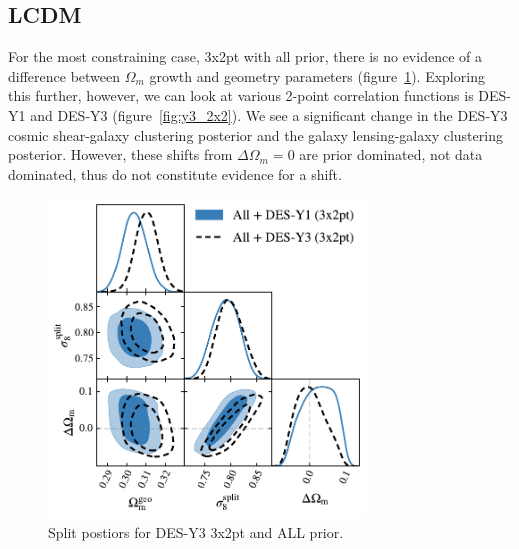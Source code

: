 \subsection{LCDM}
For the most constraining case, 3x2pt with all prior, there is no evidence of a difference between $\Omega_m$ growth and geometry parameters (figure~\ref{fig:y3_3x2_all}). Exploring this further, however, we can look at various 2-point correlation functions is DES-Y1 and DES-Y3 (figure~\ref{fig:y3_2x2}). We see a significant change in the DES-Y3 cosmic shear-galaxy clustering posterior and the galaxy lensing-galaxy clustering posterior. However, these shifts from $\Delta\Omega_m=0$ are prior dominated, not data dominated, thus do not constitute evidence for a shift.
\begin{figure}[ht]
	\centering
	\includegraphics[width=0.75\textwidth]{plots/plot204_v2.pdf}
	\caption{Split postiors for DES-Y3 3x2pt and ALL prior.}
	\label{fig:y3_3x2_all}
\end{figure}
